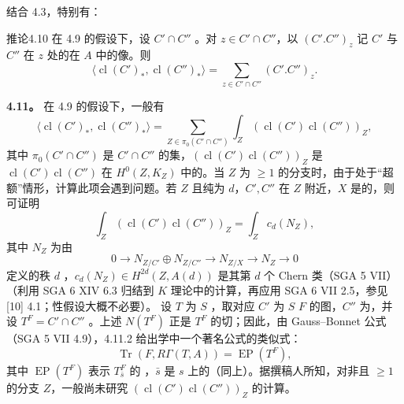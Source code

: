 结合 4.3，特别有：
\begin{SGAresult}{推论}{4.10}
在 4.9 的假设下，设 $C'\cap C''$ 。对 $z\in C'\cap C''$，以 $(C'.C'')_z$ 记 $C'$ 与 $C''$ 在 $z$ 处的在 $A$ 中的像。则
\[\langle\operatorname{cl}(C')_*,\operatorname{cl}(C'')_*\rangle=\sum_{z\in C'\cap C''}(C'.C'')_z.\]
\end{SGAresult}
\textbf{4.11。} 在 4.9 的假设下，一般有
\[\langle\operatorname{cl}(C')_*,\operatorname{cl}(C'')_*\rangle=\sum_{Z\in\pi_0(C'\cap C'')}\int_Z(\operatorname{cl}(C')\operatorname{cl}(C''))_Z,\tag{4.11.1}\]
其中 $\pi_0(C'\cap C'')$ 是 $C'\cap C''$ 的集，$(\operatorname{cl}(C')\operatorname{cl}(C''))_Z$ 是 $\operatorname{cl}(C')\operatorname{cl}(C'')$ 在 $H^0(Z,K_Z)$ 中的。当 $Z$ 为 $\geq1$ 的分支时，由于处于“超额”情形，计算此项会遇到问题。若 $Z$ 且纯为 $d$，$C',C''$ 在 $Z$ 附近，$X$ 是的，则可证明
\[\int_Z(\operatorname{cl}(C')\operatorname{cl}(C''))_Z=\int_Zc_d(N_Z),\tag{4.11.2}\]
其中 $N_Z$ 为由
\[0\longrightarrow N_{Z/C'}\oplus N_{Z/C''}\longrightarrow N_{Z/X}\longrightarrow N_Z\longrightarrow0\]
定义的秩 $d$ ，$c_d(N_Z)\in H^{2d}(Z,A(d))$ 是其第 $d$ 个 Chern 类（SGA 5 VII）（利用 SGA 6 XIV 6.3 归结到 $K$ 理论中的计算，再应用 SGA 6 VII 2.5，参见 [10] 4.1；性假设大概不必要）。
设 $T$ 为 $S$ ，取对应 $C'$ 为 $S$  $F$ 的图，$C''$ 为，并设 $T^F=C'\cap C''$ 。上述 $N(T^F)$ 正是 $T^F$ 的切；因此，由 Gauss--Bonnet 公式（SGA 5 VII 4.9），4.11.2 给出学中一个著名公式的类似式：
\[\operatorname{Tr}(F,R\Gamma(T,A))=\operatorname{EP}(T^F),\tag{4.11.3}\]
其中 $\operatorname{EP}(T^F)$ 表示 $T^F_{\bar s}$ 的 ，$\bar s$ 是 $s$ 上的（同上）。据撰稿人所知，对非且 $\geq1$ 的分支 $Z$，一般尚未研究 $(\operatorname{cl}(C')\operatorname{cl}(C''))_Z$ 的计算。
